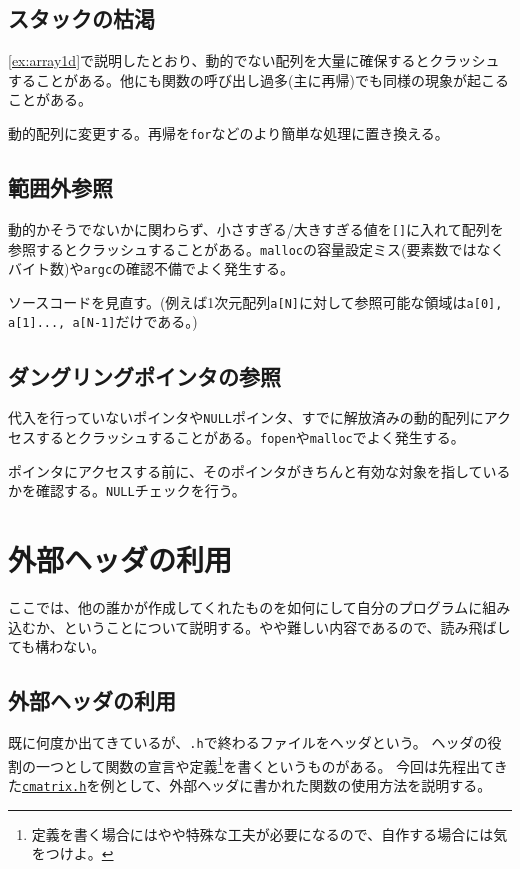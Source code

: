 \subsection*{スタックの枯渇}
\ref{ex:array1d}で説明したとおり、動的でない配列を大量に確保するとクラッシュすることがある。他にも関数の呼び出し過多(主に再帰)でも同様の現象が起こることがある。

動的配列に変更する。再帰を\texttt{for}などのより簡単な処理に置き換える。

\subsection*{範囲外参照}
動的かそうでないかに関わらず、小さすぎる/大きすぎる値を\texttt{[]}に入れて配列を参照するとクラッシュすることがある。\texttt{malloc}の容量設定ミス(要素数ではなくバイト数)や\texttt{argc}の確認不備でよく発生する。

ソースコードを見直す。(例えば1次元配列\texttt{a[N]}に対して参照可能な領域は\texttt{a[0], a[1]..., a[N-1]}だけである。)

\subsection*{ダングリングポインタの参照}
代入を行っていないポインタや\texttt{NULL}ポインタ、すでに解放済みの動的配列にアクセスするとクラッシュすることがある。\texttt{fopen}や\texttt{malloc}でよく発生する。

ポインタにアクセスする前に、そのポインタがきちんと有効な対象を指しているかを確認する。\texttt{NULL}チェックを行う。

\section{外部ヘッダの利用}
ここでは、他の誰かが作成してくれたものを如何にして自分のプログラムに組み込むか、ということについて説明する。やや難しい内容であるので、読み飛ばしても構わない。

\subsection{外部ヘッダの利用}
既に何度か出てきているが、\texttt{.h}で終わるファイルをヘッダという。
ヘッダの役割の一つとして関数の宣言や定義\footnote{定義を書く場合にはやや特殊な工夫が必要になるので、自作する場合には気をつけよ。}を書くというものがある。
今回は先程出てきた\hyperlink{cmatrix}{\texttt{cmatrix.h}}を例として、外部ヘッダに書かれた関数の使用方法を説明する。

